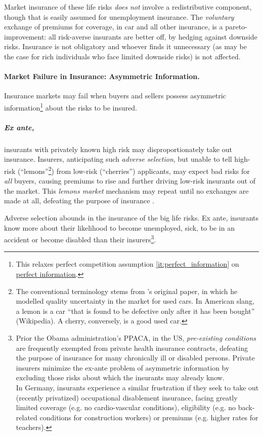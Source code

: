 Market insurance of these life risks \emph{does not} involve a redistributive component, though that is easily assumed for unemployment insurance. The \emph{voluntary} exchange of premiums for coverage, in car and all other insurance, is a pareto-improvement: all risk-averse insurants are better off, by hedging against downside risks. Insurance is not obligatory and whoever finds it unnecessary (as may be the case for rich individuals who face limited downside risks) is not affected.

\paragraph{Market Failure in Insurance: Asymmetric Information.}
\label{sec:asymmetric_information}

Insurance markets may fail when buyers and sellers possess asymmetric information\footnote{
	This relaxes perfect competition assumption \ref{it:perfect_information} on \hyperref[it:perfect_information]{perfect information}.} 
about the risks to be insured. 

\subparagraph[Adverse Selection]{Ex ante,} \label{sec:adverse_selection} insurants with privately known high risk may disproportionately take out insurance. Insurers, anticipating such \emph{adverse selection}, but unable to tell high-risk (``lemons''\footnote{
	The conventional terminology stems from \citeauthor{Akerlof-1970-aa}'s original paper, in which he modelled  quality uncertainty in the market for used cars. In American slang, a lemon is a car ``that is found to be defective only after it has been bought'' (Wikipedia). A cherry, conversely, is a good used car.}) 
from low-risk (``cherries'') applicants,  may expect bad risks for \emph{all} buyers, causing premiums to rise and further driving low-risk insurants out of the market. This \emph{lemons market} mechanism may repeat until no exchanges are made at all, defeating the purpose of insurance \citep{Akerlof-1970-aa}. 

Adverse selection abounds in the insurance of the big life risks. Ex ante, insurants know more about their likelihood to become unemployed, sick, to be in an accident or become disabled than their insurers\footnote{
	Prior the Obama administration's \gls{PPACA}, in the US, \emph{pre-existing conditions} are frequently exempted from private health insurance contracts, defeating the purpose of insurance for many chronically ill or disabled persons. Private insurers minimize the ex-ante problem of asymmetric information by excluding those risks about which the insurants may already know.\\ 
	In Germany, insurants experience a similar frustration if they seek to take out (recently privatized) occupational disablement insurance, facing greatly limited coverage (e.g. no cardio-vascular conditions), eligibility (e.g. no back-related conditions for construction workers) or premiums (e.g. higher rates for teachers).}. 

